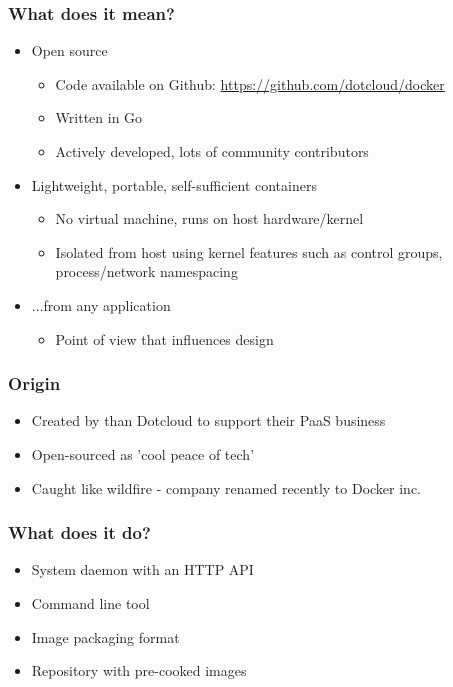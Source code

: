 \documentclass{beamer}
\begin{document}
  \begin{frame}
  	\frametitle{What does it mean?}
	\begin{itemize}  	
  		\item Open source
  	
	    \begin{itemize}
    		\item Code available on Github: \url{https://github.com/dotcloud/docker}
        	\item Written in Go
	        \item Actively developed, lots of community contributors
	    \end{itemize}
    
    \item Lightweight, portable, self-sufficient containers
    	\begin{itemize}
    		\item No virtual machine, runs on host hardware/kernel
			\item Isolated from host using kernel features such as control groups,
				process/network namespacing
	    \end{itemize}
    
    \item ...from any application
    	\begin{itemize}
    		\item Point of view that influences design
	    \end{itemize}
    \end{itemize}
    
  \end{frame}
  
  \begin{frame}
  	\frametitle{Origin}
  	\begin{itemize}
		\item Created by than Dotcloud to support their PaaS business
  		\item Open-sourced as 'cool peace of tech'
  		\item Caught like wildfire - company renamed recently to Docker inc.
  	\end{itemize}
  \end{frame}
  
  \begin{frame}
    \frametitle{What does it do?}
    \begin{itemize}
    	\item System daemon with an HTTP API
        \item Command line tool
        \item Image packaging format
	    \item Repository with pre-cooked images
	\end{itemize}
  \end{frame}
  
\end{document}
